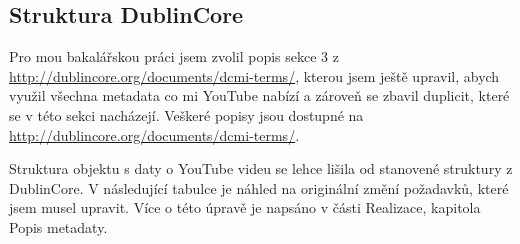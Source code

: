\subsection{Struktura DublinCore}
\par Pro mou bakalářskou práci jsem zvolil popis sekce 3 z \url{http://dublincore.org/documents/dcmi-terms/}, kterou jsem ještě upravil, abych využil všechna metadata co mi YouTube nabízí a zároveň se zbavil duplicit, které se v této sekci nacházejí. Veškeré popisy jsou dostupné na \url{http://dublincore.org/documents/dcmi-terms/}.
\par Struktura objektu s daty o YouTube videu se lehce lišila od stanovené struktury z DublinCore\cite{dublincoredocementation}. V následující tabulce je náhled na originální změní požadavků, které jsem musel upravit. Více o této úpravě je napsáno v části Realizace, kapitola Popis metadaty.
\hfill
